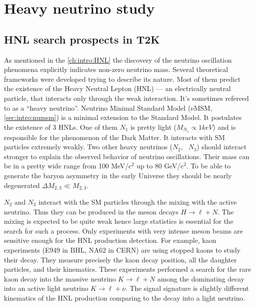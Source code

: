 \documentclass[../main.tex]{subfiles}
\begin{document}
\renewcommand{\labelitemi}{\ding{226}}
\renewcommand{\labelitemii}{\ding{227}}

\part{Heavy neutrino study}

\chapter{HNL search prospects in T2K}
\label{ch:hnl}

As mentioned in the \autoref{ch:intro:HNL} the discovery of the neutrino oscillation phenomena explicitly indicates non-zero neutrino mass. Several theoretical frameworks were developed trying to describe its nature. Most of them predict the existence of the Heavy Neutral Lepton (HNL) --- an electrically neutral particle, that interacts only through the weak interaction. It's sometimes refereed to as a ``heavy neutrino''. Neutrino Minimal Standard Model ($\nu$MSM, \autoref{sec:intro:numsm}) is a minimal extension to the Standard Model. It postulates the existence of 3 HNLs. One of them $N_1$ is pretty light ($M_{N_1}\propto1keV$) and is responsible for the phenomenon of the Dark Matter. It interacts with SM particles extremely weakly. Two other heavy neutrinos ($N_2,\text{ }N_3$) should interact stronger to explain the observed behavior of neutrino oscillations. Their mass can be in a pretty wide range from 100 MeV/$\text{c}^2$ up to 80 GeV/$\text{c}^2$. To be able to generate the baryon asymmetry in the early Universe they should be nearly degenerated $\Delta M_{2,3}\ll M_{2,3}$.

$N_2$ and $N_3$ interact with the SM particles through the mixing with the active neutrino. Thus they can be produced in the meson decays $H\to\ell+N$. The mixing is expected to be quite weak hence large statistics is essential for the search for such a process. Only experiments with very intense meson beams are sensitive enough for the HNL production detection. For example, kaon experiments (E949 in BHL, NA62 in CERN) are using stopped kaons to study their decay. They measure precisely the kaon decay position, all the daughter particles, and their kinematics. These experiments performed a search for the rare kaon decay into the massive neutrino $K\to\ell+N$ among the dominating decay into an active light neutrino $K\to\ell+\nu$. The signal signature is slightly different kinematics of the HNL production comparing to the decay into a light neutrino.
\end{document}
